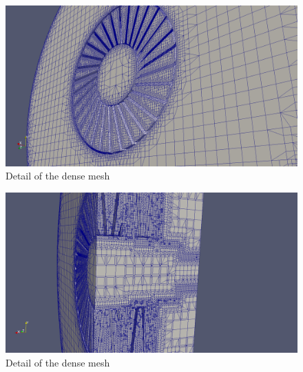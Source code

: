 \begin{figure}[h!]
\includegraphics[scale=0.26]{./mesh/screenshots/Xtreme3}
\centering
\caption{Detail of the dense mesh}
\end{figure}

\begin{figure}[h!]
\includegraphics[scale=0.26]{./mesh/screenshots/Xtreme5}
\centering
\caption{Detail of the dense mesh}
\end{figure}
